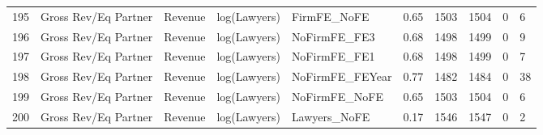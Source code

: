 \begin{table}[ht]
\begin{tabular}{rlllllllll}
  195 & Gross Rev/Eq Partner & Revenue & log(Lawyers) & FirmFE\_NoFE & 0.65 & 1503 & 1504 & 0 & 6 \\ 
  196 & Gross Rev/Eq Partner & Revenue & log(Lawyers) & NoFirmFE\_FE3 & 0.68 & 1498 & 1499 & 0 & 9 \\ 
  197 & Gross Rev/Eq Partner & Revenue & log(Lawyers) & NoFirmFE\_FE1 & 0.68 & 1498 & 1499 & 0 & 7 \\ 
  198 & Gross Rev/Eq Partner & Revenue & log(Lawyers) & NoFirmFE\_FEYear & 0.77 & 1482 & 1484 & 0 & 38 \\ 
  199 & Gross Rev/Eq Partner & Revenue & log(Lawyers) & NoFirmFE\_NoFE & 0.65 & 1503 & 1504 & 0 & 6 \\ 
  200 & Gross Rev/Eq Partner & Revenue & log(Lawyers) & Lawyers\_NoFE & 0.17 & 1546 & 1547 & 0 & 2 \\ 
   \hline
\end{tabular}
\end{table}
